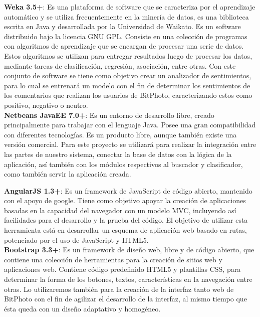 \documentclass{memoria}
\begin{document}
\textbf{Weka 3.5+}: Es una plataforma de software que se caracteriza por el aprendizaje automático y se utiliza frecuentemente en la minería de datos, es una biblioteca escrita en Java y desarrollada por la Universidad de Waikato. Es un software distribuido bajo la licencia GNU GPL. Consiste en una colección de programas con algoritmos de aprendizaje que se encargan de procesar una serie de datos. Estos algoritmos se utilizan para entregar resultados luego de procesar los datos, mediante tareas de clasificación, regresión, asociación, entre otras. Con este conjunto de software se tiene como objetivo crear un analizador de sentimientos, para lo cual se entrenará un modelo con el fin de determinar los sentimientos de los comentarios que realizan los usuarios de BitPhoto, caracterizando estos como positivo, negativo o neutro.\\

\textbf{Netbeans JavaEE 7.0+}: Es un entorno de desarrollo libre, creado principalmente para trabajar con el lenguaje Java. Posee una gran compatibilidad con diferentes tecnologías. Es un producto libre, aunque también existe una versión comercial. Para este proyecto se utilizará para realizar la integración entre las partes de nuestro sistema, conectar la base de datos con la lógica de la aplicación, así también con los módulos respectivos al buscador y clasificador, como también servir la aplicación creada.\\


\textbf{AngularJS 1.3+}: Es un framework de JavaScript de código abierto, mantenido con el apoyo de google. Tiene como objetivo apoyar la creación de aplicaciones basadas en la capacidad del navegador con un modelo MVC, incluyendo así facilidades para el desarrollo y la prueba del código. El objetivo de utilizar esta herramienta está en desarrollar un esquema de aplicación web basado en rutas, potenciado por el uso de JavaScript y HTML5.\\

\textbf{Bootstrap 3.3+}: Es un framework de diseño web, libre y de código abierto, que contiene una colección de herramientas para la creación de sitios web y aplicaciones web. Contiene código predefinido HTML5 y plantillas CSS, para determinar la forma de los botones, textos, características en la navegación entre otras. Lo utilizaremos también para la creación de la interfaz tanto web de BitPhoto con el fin de agilizar el desarrollo de la interfaz, al mismo tiempo que ésta queda con un diseño adaptativo y homogéneo.\\
\end{document}
